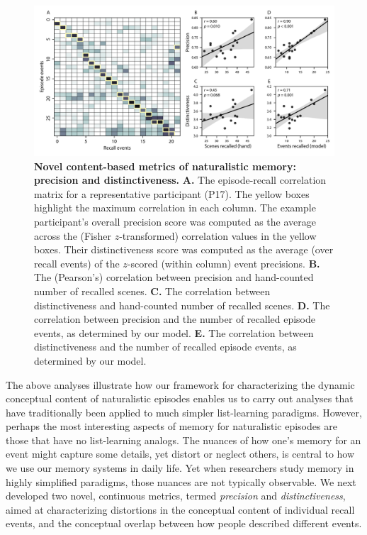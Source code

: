 \documentclass[10pt]{article}
\begin{document}
\begin{figure}[tp]
  \centering
  \includegraphics[width=1\textwidth]{figs/precision_distinctiveness}
  \caption{\small \textbf{Novel content-based metrics of naturalistic memory: precision and distinctiveness.} \textbf{A.} The episode-recall correlation matrix for a representative participant (P17).  The yellow boxes highlight the maximum correlation in each column.  The example participant's overall precision score was computed as the average across the (Fisher $z$-transformed) correlation values in the yellow boxes.  Their distinctiveness score was computed as the average (over recall events) of the $z$-scored (within column) event precisions. \textbf{B.} The (Pearson's) correlation between precision and hand-counted number of recalled scenes.  \textbf{C.} The correlation between distinctiveness and hand-counted number of recalled scenes. \textbf{D.} The correlation between precision and the number of recalled episode events, as determined by our model. \textbf{E.} The correlation between distinctiveness and the number of recalled episode events, as determined by our model.}
  \label{fig:precision-distinctiveness}
\end{figure}

The above analyses illustrate how our framework for characterizing the dynamic conceptual content of naturalistic episodes enables us to carry out analyses that have traditionally been applied to much simpler list-learning paradigms.  However, perhaps the most interesting aspects of memory for naturalistic episodes are those that have no list-learning analogs.  The nuances of how one's memory for an event might capture some details, yet distort or neglect others, is central to how we use our memory systems in daily life.  Yet when researchers study memory in highly simplified paradigms, those nuances are not typically observable.  We next developed two novel, continuous metrics, termed \textit{precision} and \textit{distinctiveness}, aimed at characterizing distortions in the conceptual content of individual recall events, and the conceptual overlap between how people described different events.
\end{document}
